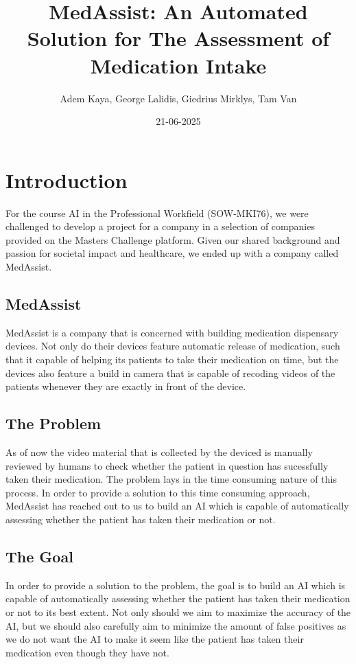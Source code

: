 \documentclass[a4paper,12pt]{article}
\title{MedAssist: An Automated Solution for The Assessment of Medication Intake}
\author{Adem Kaya, George Lalidis, Giedrius Mirklys, Tam Van}
\date{21-06-2025}
\begin{document}
\maketitle

\section{Introduction}
For the course AI in the Professional Workfield (SOW-MKI76), we were challenged 
to develop a project for a company in a selection of companies provided on the 
Masters Challenge platform. Given our shared background and passion for societal 
impact and healthcare, we ended up with a company called MedAssist.

\subsection{MedAssist}
MedAssist is a company that is concerned with building medication dispensary devices. 
Not only do their devices feature automatic release of medication, such that it 
capable of helping its patients to take their medication on time, but the devices
also feature a build in camera that is capable of recoding videos of the patients 
whenever they are exactly in front of the device. 

\subsection{The Problem}
As of now the video material that is collected by the deviced is manually reviewed by
humans to check whether the patient in question has sucessfully taken their medication. 
The problem lays in the time consuming nature of this process. In order to provide 
a solution to this time consuming approach, MedAssist has reached out to us to 
build an AI which is capable of automatically assessing whether the patient has taken
their medication or not.

\subsection{The Goal}
In order to provide a solution to the problem, the goal is to build an AI which 
is capable of automatically assessing whether the patient has taken their medication
or not to its best extent. Not only should we aim to maximize the accuracy of the
AI, but we should also carefully aim to minimize the amount of false positives as
we do not want the AI to make it seem like the patient has taken their medication 
even though they have not.
\end{document}
